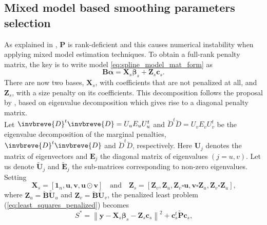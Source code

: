 \subsection{Mixed model based smoothing parameters selection}

As explained in \textcite{rodriguez2016spatial}, $\mathbf{P}$ is rank-deficient and this causes numerical instability when applying mixed model estimation techniques. To obtain a full-rank penalty matrix, the key is to write model \ref{eq:spline_model_mat_form} as 
\begin{equation}
    \mathbf{B}\boldsymbol{\alpha} = \boldsymbol{X}_{s} \boldsymbol{\beta}_{s}+\boldsymbol{Z}_{s} \boldsymbol{c}_{s}
    \text{.}
\end{equation}
There are now two bases, $\mathbf{X}_{s}$, with coefficients that are not penalized at all, and $\mathbf{Z}_{s}$, with a size penalty on its coefficients. This decomposition follows the proposal by \textcite{lee_p-spline_2011}, based on eigenvalue decomposition which gives rise to a diagonal penalty matrix.\\
Let $\invbreve{D}^{t} \invbreve{D}=U_{u} E_{u} U_{u}^{t}$ and $\breve{D}^{t} \breve{D}=U_{v} E_{v} U_{v}^{t}$ be the eigenvalue decomposition of the marginal penalties, $\invbreve{D}^{t} \invbreve{D}$ and $\breve{D}^{t} \breve{D}$, respectively. Here $\mathbf{U}_{j}$ denotes the matrix of eigenvectors and $\mathbf{E}_j$  the diagonal matrix of eigenvalues $(j=u,v)$. Let us denote $\widetilde{\boldsymbol{U}}_{j}$ and $\widetilde{\boldsymbol{E}}_{j}$ the sub-matrices corresponding to non-zero eigenvalues. Setting
\begin{equation}
    \boldsymbol{X}_{s}=\left[\mathbf{1}_{n}, \boldsymbol{u}, \boldsymbol{v}, \boldsymbol{u} \odot \boldsymbol{v}\right]
    \quad
    \text{and}
    \quad
    \mathbf{Z}_{s}=\left[\mathbf{Z}_{v}, \mathbf{Z}_{u}, \mathbf{Z}_{v} \square \mathbf{u}, \mathbf{v} \square \mathbf{Z}_{u}, \mathbf{Z}_{v} \square \mathbf{Z}_{u}\right]
    \text{,}
    \label{eq:detail_Xs_Zs_matrices}
\end{equation}
where $\mathbf{Z}_u = \breve{\mathbf{B}}\widetilde{\boldsymbol{U}}_{u}$ and $\mathbf{Z}_v = \breve{\mathbf{B}}\widetilde{\boldsymbol{U}}_{v}$, the penalized least problem (\ref{eq:least_squares_penalized}) becomes
\begin{equation}
    S^{*}=\left\|\boldsymbol{y}-\boldsymbol{X}_{s} \boldsymbol{\beta}_{s}-\boldsymbol{Z}_{s} \boldsymbol{c}_{s}\right\|^{2}+\boldsymbol{c}_{s}^{t} \widetilde{\boldsymbol{P}} \boldsymbol{c}_{s}
    \text{,}
    \label{eq:new_least_squares_penalized}
\end{equation}
